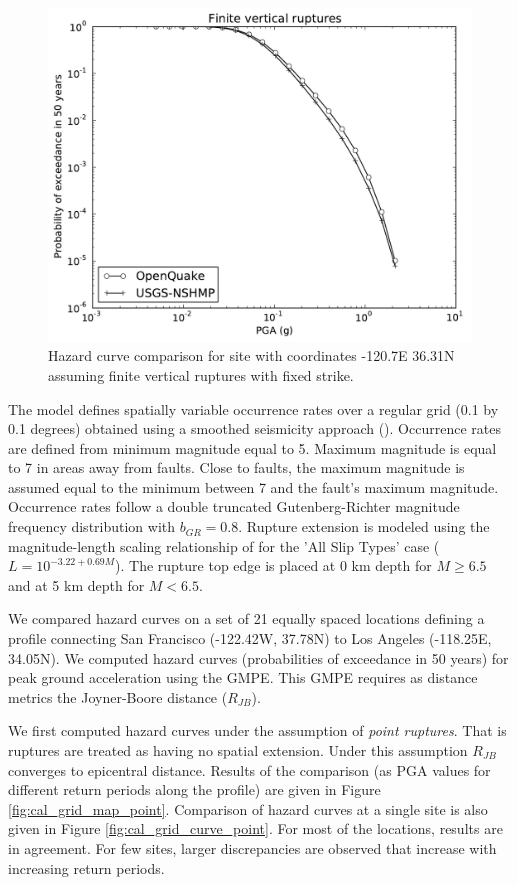 \begin{figure}[!h]
\centering
\includegraphics[width=12.5cm]{./qareport/pictures/-120pt7_36pt31_fixedstrikevertical.pdf}
\caption{Hazard curve comparison for site with coordinates -120.7E 36.31N assuming finite vertical ruptures with fixed strike.}
\label{fig:cal_grid_curve_finite}
\end{figure}

The model defines spatially variable occurrence rates over a regular grid (0.1 by 0.1 degrees) obtained using a smoothed seismicity approach (\cite{frankel1995}). Occurrence rates are defined from minimum magnitude equal to 5. Maximum magnitude is equal to 7 in areas away from faults. Close to faults, the maximum magnitude is assumed equal to the minimum between 7 and the fault's maximum magnitude. Occurrence rates follow a double truncated Gutenberg-Richter magnitude frequency distribution with $b_{GR} = 0.8$. Rupture extension is modeled using the magnitude-length scaling relationship of \citet{wells1994} for the 'All Slip Types' case ($L=10^{-3.22+0.69 M}$). The rupture top edge is placed at 0 km depth for $M \ge 6.5$ and at 5 km depth for  $M < 6.5$.

We compared hazard curves on a set of 21 equally spaced locations defining a profile connecting San Francisco (-122.42W, 37.78N) to Los Angeles (-118.25E, 34.05N). We computed hazard curves (probabilities of exceedance in 50 years) for peak ground acceleration using the \citet{boore2008} GMPE. This GMPE requires as distance metrics the Joyner-Boore distance ($R_{JB}$). 

We first computed hazard curves under the assumption of \textit{point ruptures}. That is ruptures are treated as having no spatial extension. Under this assumption $R_{JB}$ converges to epicentral distance. Results of the comparison (as PGA values for different return periods along the profile) are given in Figure \ref{fig:cal_grid_map_point}. Comparison of hazard curves at a single site is also given in Figure \ref{fig:cal_grid_curve_point}. For most of the locations, results are in agreement. For few sites, larger discrepancies are observed that increase with increasing return periods.

